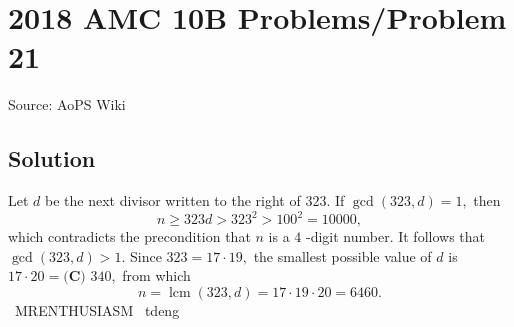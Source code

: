 \documentclass[12pt]{article}
\begin{document}
\section*{{2018 AMC 10B Problems/Problem 21}}
Source: AoPS Wiki

\subsection*{Solution}
Let $d$ be the next divisor written to the right of $323.$ If $\gcd(323,d)=1,$ then \[n\geq323d>323^2>100^2=10000,\] which contradicts the precondition that $n$ is a $4$ -digit number. It follows that $\gcd(323,d)>1.$ Since $323=17\cdot19,$ the smallest possible value of $d$ is $17\cdot20=\boxed{\textbf{(C) } 340},$ from which \[n=\operatorname{lcm}(323,d)=17\cdot19\cdot20=6460.\] ~MRENTHUSIASM ~tdeng
\end{document}
